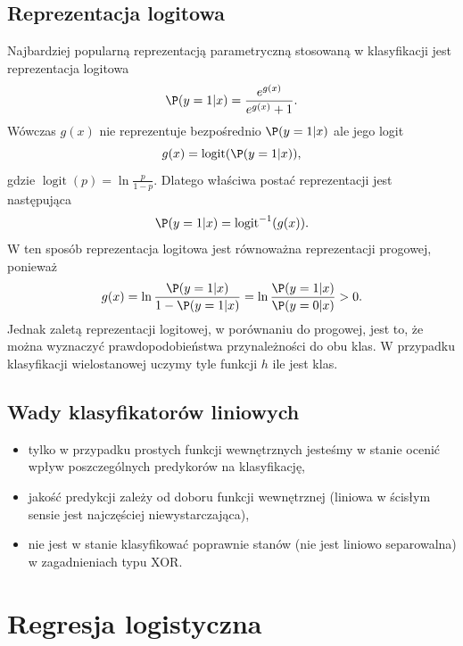 \documentclass[]{book}
\providecommand{\tightlist}{%
  \setlength{\itemsep}{0pt}\setlength{\parskip}{0pt}}
\newcommand{\logit}{\operatorname{logit}}
\theoremstyle{plain}
\theoremstyle{definition}
\theoremstyle{definition}
\theoremstyle{definition}
\theoremstyle{definition}
\theoremstyle{remark}
\begin{document}
\hypertarget{reprezentacja-logitowa}{%
\section{Reprezentacja logitowa}\label{reprezentacja-logitowa}}

Najbardziej popularną reprezentacją parametryczną stosowaną w klasyfikacji jest reprezentacja logitowa
\begin{equation}
    \P(y=1|x)=\frac{e^{g(x)}}{e^{g(x)}+1}.
\end{equation}
Wówczas \(g(x)\) nie reprezentuje bezpośrednio \(\P(y=1|x)\) ale jego logit
\begin{equation}
    g(x)=\logit(\P(y=1|x)),
\end{equation}
gdzie \(\logit(p)=\ln\frac{p}{1-p}\). Dlatego właściwa postać reprezentacji jest następująca
\begin{equation}
    \P(y=1|x)=\logit^{-1}(g(x)).
\end{equation}
W ten sposób reprezentacja logitowa jest równoważna reprezentacji progowej, ponieważ
\begin{equation}
    g(x)=\ln\frac{\P(y=1|x)}{1-\P(y=1|x)}=\ln\frac{\P(y=1|x)}{\P(y=0|x)}>0.
\end{equation}
Jednak zaletą reprezentacji logitowej, w porównaniu do progowej, jest to, że można wyznaczyć prawdopodobieństwa przynależności do obu klas. W przypadku klasyfikacji wielostanowej uczymy tyle funkcji \(h\) ile jest klas.

\hypertarget{wady-klasyfikatorow-liniowych}{%
\section{Wady klasyfikatorów liniowych}\label{wady-klasyfikatorow-liniowych}}

\begin{itemize}
\tightlist
\item
  tylko w przypadku prostych funkcji wewnętrznych jesteśmy w stanie ocenić wpływ poszczególnych predykorów na klasyfikację,
\item
  jakość predykcji zależy od doboru funkcji wewnętrznej (liniowa w ścisłym sensie jest najczęściej niewystarczająca),
\item
  nie jest w stanie klasyfikować poprawnie stanów (nie jest liniowo separowalna) w zagadnieniach typu XOR.
\end{itemize}

\hypertarget{regresja-logistyczna}{%
\chapter{Regresja logistyczna}\label{regresja-logistyczna}}
\end{document}

